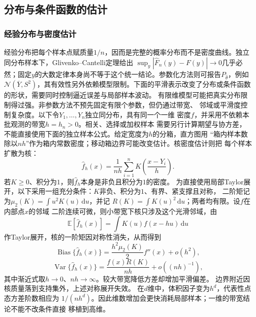 \subsection{分布与条件函数的估计}
\subsubsection{经验分布与密度估计}
\label{sec:statistics-nonparametric-missing}
经验分布把每个样本点赋质量\(1/n\)，因而是完整的概率分布而不是密度曲线。独立同分布样本下，Glivenko--Cantelli定理给出
\(\sup_y|\widehat F_n(y)-F(y)|\to0\)几乎必然；固定\(y\)的大数定律本身尚不等于这个统一结论。参数化方法则可报告\(P_{\widehat\theta}\)，例如
\(\mathcal N(\overline Y,S^2)\)，其有效性另外依赖模型限制。下面的平滑表示改变了分布或条件函数的形状，需要同时控制逼近误差与局部样本波动。
有限维模型可能把真实分布限制得过强。非参数方法不预先固定有限个参数，但仍通过带宽、
邻域或平滑度控制复杂度。以下令\(Y_1,\ldots,Y_n\)独立同分布，具有同一个一维
密度\(f\)，并采用不依赖本批观测的带宽\(h=h_n>0\)。相关、选择或加权样本
需要另行计算期望与协方差，不能直接使用下面的独立样本公式。给定宽度为\(h\)的分箱，直方图用
“箱内样本数除以\(nh\)”作为箱内常数密度；移动箱边界可能改变估计。核密度估计则把
每个样本扩散为核：
\[
  \widehat f_h(x)
  =\frac1{nh}\sum_{i=1}^n
    K\left(\frac{x-Y_i}{h}\right).
\]
若\(K\geq0\)、积分为\(1\)，则\(\widehat f_h\)本身是非负且积分为\(1\)的密度。
为直接使用局部Taylor展开，以下采用一组充分条件：\(K\)非负、积分为\(1\)、有界、紧支撑且对称，
二阶矩记为\(\mu_2(K)=\int u^2K(u)\,\mathrm du\)，并记
\(R(K)=\int K(u)^2\,\mathrm du\)；两者均有限。设\(f\)在内部点\(x\)的邻域
二阶连续可微，则小带宽下核只涉及这个光滑邻域，由
\[
  \mathbb{E}[\widehat f_h(x)]
  =\int K(u)f(x-hu)\,\mathrm du
\]
作Taylor展开，核的一阶矩因对称性消失，从而得到
\[
  \operatorname{Bias}\{\widehat f_h(x)\}
  =\frac{h^2\mu_2(K)}2f''(x)+o(h^2),
\]
\[
  \operatorname{Var}\{\widehat f_h(x)\}
  =\frac{f(x)R(K)}{nh}+o((nh)^{-1}),
\]
其中渐近式取\(h\to0\)、\(nh\to\infty\)。较大带宽降低方差却增加平滑偏差。
边界附近因核质量落到支持集外，上述对称展开失效。
在\(d\)维中，体积因子变为\(h^d\)，代表性点态方差阶数相应为
\(1/(nh^d)\)。因此维数增加会更快消耗局部样本；一维的带宽结论不能不改条件直接
移植到高维。

